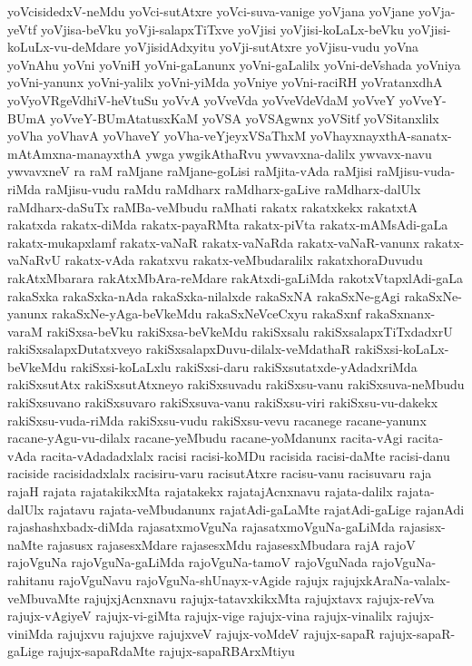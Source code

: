 {yoVcisidedxV-neMdu
yoVci-sutAtxre
yoVci-suva-vanige
yoVjana
yoVjane
yoVja-yeVtf
yoVjisa-beVku
yoVji-salapxTiTxve
yoVjisi
yoVjisi-koLaLx-beVku
yoVjisi-koLuLx-vu-deMdare
yoVjisidAdxyitu
yoVji-sutAtxre
yoVjisu-vudu
yoVna
yoVnAhu
yoVni
yoVniH
yoVni-gaLanunx
yoVni-gaLalilx
yoVni-deVshada
yoVniya
yoVni-yanunx
yoVni-yalilx
yoVni-yiMda
yoVniye
yoVni-raciRH
yoVratanxdhA
yoVyoVRgeVdhiV-heVtuSu
yoVvA
yoVveVda
yoVveVdeVdaM
yoVveY
yoVveY-BUmA
yoVveY-BUmAtatusxKaM
yoVSA
yoVSAgwnx
yoVSitf
yoVSitanxlilx
yoVha
yoVhavA
yoVhaveY
yoVha-veYjeyxVSaThxM
yoVhayxnayxthA-sanatx-mAtAmxna-manayxthA
ywga
ywgikAthaRvu
ywvavxna-dalilx
ywvavx-navu
ywvavxneV
ra
raM
raMjane
raMjane-goLisi
raMjita-vAda
raMjisi
raMjisu-vuda-riMda
raMjisu-vudu
raMdu
raMdharx
raMdharx-gaLive
raMdharx-dalUlx
raMdharx-daSuTx
raMBa-veMbudu
raMhati
rakatx
rakatxkekx
rakatxtA
rakatxda
rakatx-diMda
rakatx-payaRMta
rakatx-piVta
rakatx-mAMsAdi-gaLa
rakatx-mukapxlamf
rakatx-vaNaR
rakatx-vaNaRda
rakatx-vaNaR-vanunx
rakatx-vaNaRvU
rakatx-vAda
rakatxvu
rakatx-veMbudaralilx
rakatxhoraDuvudu
rakAtxMbarara
rakAtxMbAra-reMdare
rakAtxdi-gaLiMda
rakotxVtapxlAdi-gaLa
rakaSxka
rakaSxka-nAda
rakaSxka-nilalxde
rakaSxNA
rakaSxNe-gAgi
rakaSxNe-yanunx
rakaSxNe-yAga-beVkeMdu
rakaSxNeVceCxyu
rakaSxnf
rakaSxnanx-varaM
rakiSxsa-beVku
rakiSxsa-beVkeMdu
rakiSxsalu
rakiSxsalapxTiTxdadxrU
rakiSxsalapxDutatxveyo
rakiSxsalapxDuvu-dilalx-veMdathaR
rakiSxsi-koLaLx-beVkeMdu
rakiSxsi-koLaLxlu
rakiSxsi-daru
rakiSxsutatxde-yAdadxriMda
rakiSxsutAtx
rakiSxsutAtxneyo
rakiSxsuvadu
rakiSxsu-vanu
rakiSxsuva-neMbudu
rakiSxsuvano
rakiSxsuvaro
rakiSxsuva-vanu
rakiSxsu-viri
rakiSxsu-vu-dakekx
rakiSxsu-vuda-riMda
rakiSxsu-vudu
rakiSxsu-vevu
racanege
racane-yanunx
racane-yAgu-vu-dilalx
racane-yeMbudu
racane-yoMdanunx
racita-vAgi
racita-vAda
racita-vAdadadxlalx
racisi
racisi-koMDu
racisida
racisi-daMte
racisi-danu
raciside
racisidadxlalx
racisiru-varu
racisutAtxre
racisu-vanu
racisuvaru
raja
rajaH
rajata
rajatakikxMta
rajatakekx
rajatajAcnxnavu
rajata-dalilx
rajata-dalUlx
rajatavu
rajata-veMbudanunx
rajatAdi-gaLaMte
rajatAdi-gaLige
rajanAdi
rajashashxbadx-diMda
rajasatxmoVguNa
rajasatxmoVguNa-gaLiMda
rajasisx-naMte
rajasusx
rajasesxMdare
rajasesxMdu
rajasesxMbudara
rajA
rajoV
rajoVguNa
rajoVguNa-gaLiMda
rajoVguNa-tamoV
rajoVguNada
rajoVguNa-rahitanu
rajoVguNavu
rajoVguNa-shUnayx-vAgide
rajujx
rajujxkAraNa-valalx-veMbuvaMte
rajujxjAcnxnavu
rajujx-tatavxkikxMta
rajujxtavx
rajujx-reVva
rajujx-vAgiyeV
rajujx-vi-giMta
rajujx-vige
rajujx-vina
rajujx-vinalilx
rajujx-viniMda
rajujxvu
rajujxve
rajujxveV
rajujx-voMdeV
rajujx-sapaR
rajujx-sapaR-gaLige
rajujx-sapaRdaMte
rajujx-sapaRBArxMtiyu
}
